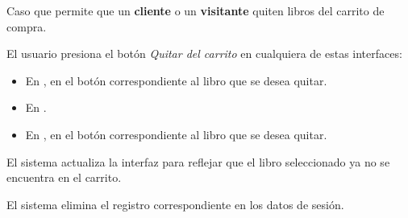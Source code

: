 %
%

{
  Caso que permite que un \textbf{cliente} o un \textbf{visitante} quiten
  libros del carrito de compra.

  \begin{trayectoriaPrincipal}

    \item El usuario presiona el botón \textit{Quitar del carrito} en
      cualquiera de estas interfaces:
      \begin{itemize}
        \item En , en el botón correspondiente
          al libro que se desea quitar.
        \item En .
        \item En , en el botón
          correspondiente al libro que se desea quitar.
      \end{itemize}

    \item El sistema actualiza la interfaz para reflejar que el libro
      seleccionado ya no se encuentra en el carrito.

    \item El sistema elimina el registro correspondiente en los datos de
      sesión.

  \end{trayectoriaPrincipal}
}
